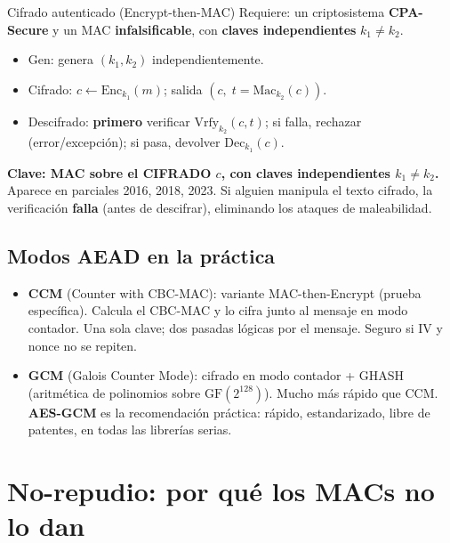 \documentclass[11pt,a4paper]{article}
\begin{document}
\begin{definicion}{Cifrado autenticado (Encrypt-then-MAC)}
Requiere: un criptosistema \textbf{CPA-Secure} y un MAC \textbf{infalsificable},
con \textbf{claves independientes} $k_1 \neq k_2$.
\begin{itemize}[leftmargin=1.4em,nosep]
  \item $\mathrm{Gen}$: genera $(k_1, k_2)$ independientemente.
  \item Cifrado: $c \leftarrow \mathrm{Enc}_{k_1}(m)$; salida $(c,\; t=\mathrm{Mac}_{k_2}(c))$.
  \item Descifrado: \textbf{primero} verificar $\mathrm{Vrfy}_{k_2}(c,t)$; si falla,
        rechazar (error/excepci\'on); si pasa, devolver $\mathrm{Dec}_{k_1}(c)$.
\end{itemize}
\end{definicion}

\begin{destacado}
\textbf{Clave: MAC sobre el CIFRADO $c$, con claves independientes $k_1\neq k_2$.}
Aparece en parciales 2016, 2018, 2023.  Si alguien manipula el texto cifrado,
la verificaci\'on \textbf{falla} (antes de descifrar), eliminando los ataques de
maleabilidad.
\end{destacado}

\subsection{Modos AEAD en la pr\'actica}

\begin{itemize}[leftmargin=1.4em]
  \item \textbf{CCM} (Counter with CBC-MAC): variante MAC-then-Encrypt (prueba
        espec\'ifica).  Calcula el CBC-MAC y lo cifra junto al mensaje en modo
        contador.  Una sola clave; dos pasadas l\'ogicas por el mensaje.
        Seguro si IV y nonce no se repiten.
  \item \textbf{GCM} (Galois Counter Mode): cifrado en modo contador + GHASH
        (aritm\'etica de polinomios sobre $\mathrm{GF}(2^{128})$).
        Mucho m\'as r\'apido que CCM.
        \textbf{AES-GCM} es la recomendaci\'on pr\'actica: r\'apido,
        estandarizado, libre de patentes, en todas las librer\'ias serias.
\end{itemize}

\section{No-repudio: por qu\'e los MACs no lo dan}
\end{document}
